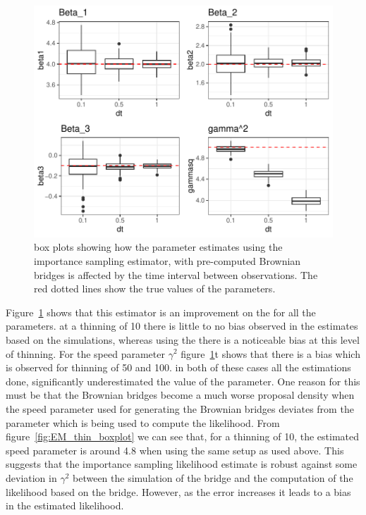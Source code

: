 \begin{figure}[H]
    \centering
    \includegraphics[width=\linewidth]{Images/Results/varying dt estimates precomputed BB.pdf}
    \caption[Box plots of Parameter Estimates for various observation intervals]{box plots showing how the parameter estimates using the importance sampling estimator, with pre-computed Brownian bridges is affected by the time interval between observations. The red dotted lines show the true values of the parameters.}
    \label{fig:varying dt boxplot precomputed BB}
\end{figure}

Figure~\ref{fig:varying dt boxplot precomputed BB} shows that this estimator is an improvement on the \cite{michelot_langevin_2019} for all the parameters. at a thinning of 10 there is little to no bias observed in the estimates based on the simulations, whereas using the \cite{michelot_langevin_2019} there is a noticeable bias at this level of thinning. For the speed parameter $\gamma^2$ figure~\ref{fig:varying dt boxplot precomputed BB}t shows that there is a bias which is observed for thinning of 50 and 100. in both of these cases all the estimations done, significantly underestimated the value of the parameter. One reason for this must be that the Brownian bridges become a much worse proposal density when the speed parameter used for generating the Brownian bridges deviates from the parameter which is being used to compute the likelihood. From figure~\ref{fig:EM_thin_boxplot} we can see that, for a thinning of 10, the estimated speed parameter is around 4.8 when using the same setup as used above. This suggests that the importance sampling likelihood estimate is robust against some deviation in $\gamma^2$ between the simulation of the bridge and the computation of the likelihood based on the bridge. However, as the error increases it leads to a bias in the estimated likelihood.

